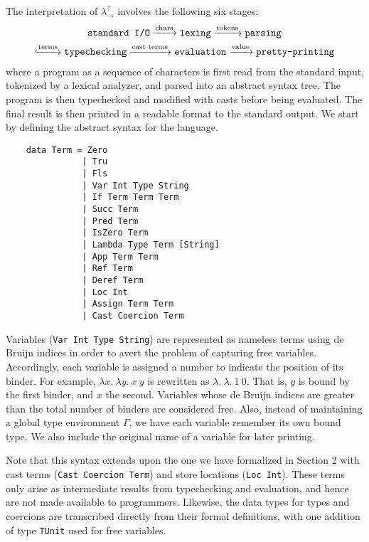 The interpretation of $\lambda ^? _{\rightarrow}$ involves the following 
six stages:
\begin{gather*}
    \texttt{standard I/O} \xrightarrow{\text{chars}}
    \texttt{lexing} \xrightarrow{\text{tokens}} \texttt{parsing} \\
    \lhook\joinrel\xrightarrow{\text{terms}} \texttt{typechecking} 
    \xrightarrow{\text{cast terms}} \texttt{evaluation} 
    \xrightarrow{\text{value}} \texttt{pretty-printing}
\end{gather*}
where a program as a sequence of characters is first read from the 
standard input, tokenized by a lexical analyzer, and parsed into 
an abstract syntax tree. The program is then typechecked and 
modified with casts before being evaluated. The final 
result is then printed in a readable format to the standard output.  We start by 
defining the abstract syntax for the language.

\begin{lstlisting}
    data Term = Zero                       
               | Tru                        
               | Fls                        
               | Var Int Type String        
               | If Term Term Term          
               | Succ Term                   
               | Pred Term                  
               | IsZero Term                
               | Lambda Type Term [String]  
               | App Term Term              
               | Ref Term                   
               | Deref Term                 
               | Loc Int                    
               | Assign Term Term          
               | Cast Coercion Term   
\end{lstlisting}

Variables (\lstinline{Var Int Type String}) are represented as nameless terms using de Bruijn indices 
in order to avert the problem of capturing free variables. Accordingly, each variable 
is assigned a number to indicate the position of its binder. For example, 
$\lambda x. \: \lambda y. \: x \: y$ is rewritten as $\lambda. \: \lambda. 
\: 1 \: 0$. That is, $y$ is bound by the first binder, and $x$ the second. 
Variables whose de Bruijn indices are greater than the total number of binders 
are considered free. Also, instead of maintaining a global type environment 
$\Gamma$, we have each variable remember its own bound type. We also 
include the original name of a variable for later printing.

Note that this syntax extends upon the one we have formalized in Section 2 
with cast terms (\lstinline{Cast Coercion Term}) and  
store locations (\lstinline{Loc Int}). These terms only arise as intermediate 
results from typechecking and evaluation, and hence are not made available 
to programmers. Likewise, the data types for types and coercions are transcribed 
directly from their formal definitions, with one addition of type \lstinline{TUnit} 
used for free variables.


